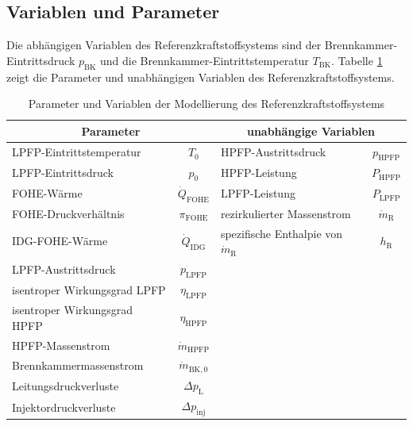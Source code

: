 \subsection{Variablen und Parameter}

Die abhängigen Variablen des Referenzkraftstoffsystems sind der Brennkammer-Eintrittsdruck $p_{\mathrm{BK}}$ und die Brennkammer-Eintrittstemperatur $T_{\mathrm{BK}}$. Tabelle \ref{Tab:referenz_params} zeigt die Parameter und unabhängigen Variablen des Referenzkraftstoffsystems.

\begin{table}[ht]
    \centering
	\caption{Parameter und Variablen der Modellierung des  Referenzkraftstoffsystems}
	\begin{tabular} {|l|c|l|c|} \hline%
		\multicolumn{2}{|c}{Parameter} & \multicolumn{2}{|c|}{unabhängige Variablen}\\ \hline\hline%
        LPFP-Eintrittstemperatur & $T_0$ & HPFP-Austrittsdruck & $p_{\mathrm{HPFP}}$ \\ \hline
        LPFP-Eintrittsdruck & $p_0$ & HPFP-Leistung & $P_{\mathrm{HPFP}}$ \\ \hline
        FOHE-Wärme & $\dot{Q}_{\mathrm{FOHE}}$ & LPFP-Leistung & $P_{\mathrm{LPFP}}$ \\ \hline
        FOHE-Druckverhältnis & $\pi_{\mathrm{FOHE}}$ & rezirkulierter Massenstrom & $\dot{m}_\mathrm{R}$ \\ \hline
        IDG-FOHE-Wärme  & $\dot{Q}_{\mathrm{IDG}}$ & spezifische Enthalpie von $\dot{m}_\mathrm{R}$ & $h_\mathrm{R}$                 \\ \hline
        LPFP-Austrittsdruck & $p_{\mathrm{LPFP}}$& \multicolumn{2}{c|}{}\\ \hline
        isentroper Wirkungsgrad LPFP & $\eta_{\mathrm{LPFP}}$& \multicolumn{2}{c|}{}\\ \hline
        isentroper Wirkungsgrad HPFP & $\eta_{\mathrm{HPFP}}$& \multicolumn{2}{c|}{}\\ \hline
        HPFP-Massenstrom & $\dot{m}_{\mathrm{HPFP}}$& \multicolumn{2}{c|}{}\\ \hline
        Brennkammermassenstrom & $\dot{m}_{\mathrm{BK},0}$& \multicolumn{2}{c|}{}\\ \hline
        Leitungsdruckverluste & $\Delta p_{\mathrm{L}}$& \multicolumn{2}{c|}{}\\ \hline
        Injektordruckverluste & $\Delta p_{\mathrm{inj}}$& \multicolumn{2}{c|}{}\\ \hline
	\end{tabular}	
    \label{Tab:referenz_params}%
\end{table}
\FloatBarrier 

